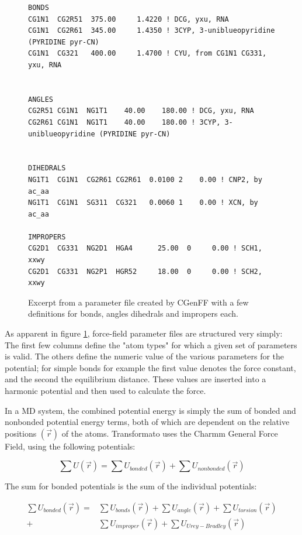 \documentclass[oneside]{scrreprt}
\begin{document}
\begin{figure}
\small
\begin{verbatim}
BONDS
CG1N1  CG2R51  375.00     1.4220 ! DCG, yxu, RNA
CG1N1  CG2R61  345.00     1.4350 ! 3CYP, 3-uniblueopyridine (PYRIDINE pyr-CN)
CG1N1  CG321   400.00     1.4700 ! CYU, from CG1N1 CG331, yxu, RNA
        

ANGLES
CG2R51 CG1N1  NG1T1    40.00    180.00 ! DCG, yxu, RNA
CG2R61 CG1N1  NG1T1    40.00    180.00 ! 3CYP, 3-uniblueopyridine (PYRIDINE pyr-CN)


DIHEDRALS
NG1T1  CG1N1  CG2R61 CG2R61  0.0100 2    0.00 ! CNP2, by ac_aa
NG1T1  CG1N1  SG311  CG321   0.0060 1    0.00 ! XCN, by ac_aa

IMPROPERS
CG2D1  CG331  NG2D1  HGA4      25.00  0     0.00 ! SCH1, xxwy
CG2D1  CG331  NG2P1  HGR52     18.00  0     0.00 ! SCH2, xxwy

\end{verbatim}
   \caption{Excerpt from a parameter file created by CGenFF with a few definitions for bonds, angles dihedrals and impropers each.}
    \label{fig:parmfile}
\end{figure}

As apparent in figure \ref{fig:parmfile}, force-field parameter files are structured very simply: The first few columns define the "atom types" for which a given set of parameters is valid. The others define the numeric value of the various parameters for the potential; for simple bonds for example the first value denotes the force constant, and the second the equilibrium distance. These values are inserted into a harmonic potential and then used to calculate the force. 


In a MD system, the combined potential energy is simply the sum of bonded and nonbonded potential energy terms, both of which are dependent on the relative positions $(\Vec{r})$ of the atoms. Transformato uses the Charmm General Force Field\cite{vanommeslaeghe_charmm_2010}, using the following potentials:


\begin{equation}\label{eq:mdforces}
    \sum U (\Vec{r}) = \sum U_{bonded} (\Vec{r}) + \sum U_{nonbonded} (\Vec{r})
\end{equation}

The sum for bonded potentials is the sum of the individual potentials:

\begin{equation}\label{eq:bondeds}
\begin{aligned}
    \sum U_{bonded} (\Vec{r})= &\sum U_{bonds} (\Vec{r}) + \sum U_{angle} (\Vec{r}) + \sum U_{torsion} (\Vec{r}) \\
    +&\sum U_{improper} (\Vec{r})+\sum U_{Urey-Bradley} (\Vec{r})
\end{aligned}
\end{equation}
\end{document}
